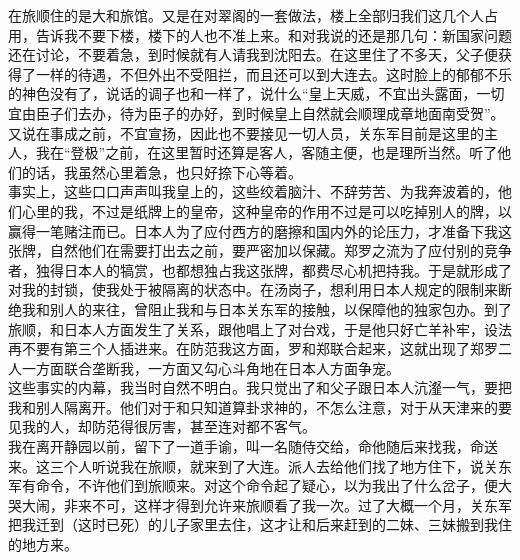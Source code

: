 在旅顺住的是大和旅馆。又是在对翠阁的一套做法，楼上全部归我们这几个人占用，告诉我不要下楼，楼下的人也不准上来。和对我说的还是那几句：新国家问题还在讨论，不要着急，到时候就有人请我到沈阳去。在这里住了不多天，父子便获得了一样的待遇，不但外出不受阻拦，而且还可以到大连去。这时脸上的郁郁不乐的神色没有了，说话的调子也和一样了，说什么“皇上天威，不宜出头露面，一切宜由臣子们去办，待为臣子的办好，到时候皇上自然就会顺理成章地面南受贺”。又说在事成之前，不宜宣扬，因此也不要接见一切人员，关东军目前是这里的主人，我在“登极”之前，在这里暂时还算是客人，客随主便，也是理所当然。听了他们的话，我虽然心里着急，也只好捺下心等着。\\

事实上，这些口口声声叫我皇上的，这些绞着脑汁、不辞劳苦、为我奔波着的，他们心里的我，不过是纸牌上的皇帝，这种皇帝的作用不过是可以吃掉别人的牌，以赢得一笔赌注而已。日本人为了应付西方的磨擦和国内外的论压力，才准备下我这张牌，自然他们在需要打出去之前，要严密加以保藏。郑罗之流为了应付别的竞争者，独得日本人的犒赏，也都想独占我这张牌，都费尽心机把持我。于是就形成了对我的封锁，使我处于被隔离的状态中。在汤岗子，想利用日本人规定的限制来断绝我和别人的来往，曾阻止我和与日本关东军的接触，以保障他的独家包办。到了旅顺，和日本人方面发生了关系，跟他唱上了对台戏，于是他只好亡羊补牢，设法再不要有第三个人插进来。在防范我这方面，罗和郑联合起来，这就出现了郑罗二人一方面联合垄断我，一方面又勾心斗角地在日本人方面争宠。\\

这些事实的内幕，我当时自然不明白。我只觉出了和父子跟日本人沆瀣一气，要把我和别人隔离开。他们对于和只知道算卦求神的，不怎么注意，对于从天津来的要见我的人，却防范得很厉害，甚至连对都不客气。\\

我在离开静园以前，留下了一道手谕，叫一名随侍交给，命他随后来找我，命送来。这三个人听说我在旅顺，就来到了大连。派人去给他们找了地方住下，说关东军有命令，不许他们到旅顺来。对这个命令起了疑心，以为我出了什么岔子，便大哭大闹，非来不可，这样才得到允许来旅顺看了我一次。过了大概一个月，关东军把我迁到（这时已死）的儿子家里去住，这才让和后来赶到的二妹、三妹搬到我住的地方来。\\

